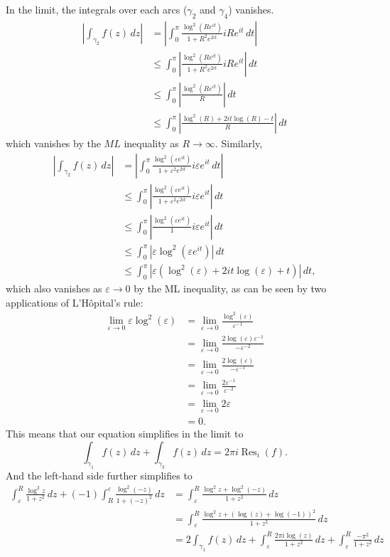 \documentclass{article}
\begin{document}
In the limit, the integrals over each arcs ($\gamma_2$ and $\gamma_4$) vanishes.
\begin{align*}
  \left|\int_{\gamma_2}f(z)\,dz\right|
  &= \left|
    \int_0^{\pi}\frac{\log^2(Re^{it})}{1 + R^2e^{2it}}iRe^{it}\,dt
  \right|\\
  &\leq \int_0^{\pi}\left|
    \frac{\log^2(Re^{it})}{1 + R^2e^{2it}}iRe^{it}
  \right|\,dt \\
  &\leq \int_0^{\pi}\left|
    \frac{\log^2(Re^{it})}{R}
  \right|\,dt \\
  &\leq \int_0^{\pi}\left|
    \frac{\log^2(R) + 2it\log(R) - t}{R}
  \right|\,dt
\end{align*} which vanishes by the $ML$ inequality as $R \rightarrow \infty$.
Similarly, \begin{align*}
  \left|\int_{\gamma_2}f(z)\,dz\right|
  &= \left|
    \int_0^{\pi}\frac{\log^2(\varepsilon e^{it})}{1 + \varepsilon ^2e^{2it}}i\varepsilon e^{it}\,dt
  \right|\\
  &\leq \int_0^{\pi}\left|
    \frac{\log^2(\varepsilon e^{it})}{1 + \varepsilon ^2e^{2it}}i\varepsilon e^{it}
  \right|\,dt \\
  &\leq \int_0^{\pi}\left|
    \frac{\log^2(\varepsilon e^{it})}{1}i\varepsilon e^{it}
  \right|\,dt \\
  &\leq \int_0^{\pi}\left|
    \varepsilon\log^2(\varepsilon e^{it})
  \right|\,dt \\
  &\leq \int_0^{\pi}\left|
    \varepsilon(\log^2(\varepsilon) + 2it\log(\varepsilon) + t)
  \right|\,dt,
\end{align*} which also vanishes as $\varepsilon \rightarrow 0$ by the ML
inequality, as can be seen by two applications of L'H\^opital's rule:
\begin{align*}
  \lim_{\varepsilon \rightarrow 0} \varepsilon\log^2(\varepsilon)
  &= \lim_{\varepsilon \rightarrow 0} \frac{\log^2(\varepsilon)}{\varepsilon^{-1}} \\
  &= \lim_{\varepsilon \rightarrow 0} \frac{2\log(\varepsilon)\varepsilon^{-1}}{-\varepsilon^{-2}}\\
  &= \lim_{\varepsilon \rightarrow 0} \frac{2\log(\varepsilon)}{-\varepsilon^{-1}} \\
  &= \lim_{\varepsilon \rightarrow 0} \frac{2\varepsilon^{-1}}{\varepsilon^{-2}} \\
  &= \lim_{\varepsilon \rightarrow 0} 2\varepsilon \\
  &= 0.
\end{align*}
This means that our equation simplifies in the limit to \[
  \int_{\gamma_1} f(z)\,dz +
  \int_{\gamma_3} f(z)\,dz =
  2\pi i \operatorname{Res}_i(f).
\] And the left-hand side further simplifies to \begin{align*}
  \int_\varepsilon^R\frac{\log^2 z}{1 + z^2}\,dz
  + (-1)\int_R^\varepsilon\frac{\log^2(-z)}{1 + (-z)^2}\,dz &=
  \int_\varepsilon^R\frac{\log^2 z + \log^2(-z)}{1 + z^2}\,dz \\
  &= \int_\varepsilon^R\frac{\log^2 z + (\log(z) + \log(-1))^2}{1 + z^2}\,dz \\
  &= 2\int_{\gamma_1} f(z)\,dz + \int_\varepsilon^R\frac{2\pi i\log(z)}{1 + z^2}\,dz + \int_\varepsilon^R\frac{-\pi^2}{1 + z^2}\,dz
\end{align*}
\end{document}
